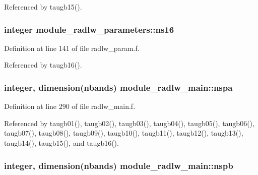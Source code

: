 Referenced by taugb15().

\subsubsection[{\texorpdfstring{ns16}{ns16}}]{\setlength{\rightskip}{0pt plus 5cm}integer module\+\_\+radlw\+\_\+parameters\+::ns16}\hypertarget{group__module__radlw__main_ga3a7ba0b8f35271e7979deea86f834479}{}\label{group__module__radlw__main_ga3a7ba0b8f35271e7979deea86f834479}


Definition at line 141 of file radlw\+\_\+param.\+f.



Referenced by taugb16().

\subsubsection[{\texorpdfstring{nspa}{nspa}}]{\setlength{\rightskip}{0pt plus 5cm}integer, dimension(nbands) module\+\_\+radlw\+\_\+main\+::nspa\hspace{0.3cm}{\ttfamily [private]}}\hypertarget{group__module__radlw__main_ga42bbf62b5d91586f17d352af74e3c032}{}\label{group__module__radlw__main_ga42bbf62b5d91586f17d352af74e3c032}


Definition at line 290 of file radlw\+\_\+main.\+f.



Referenced by taugb01(), taugb02(), taugb03(), taugb04(), taugb05(), taugb06(), taugb07(), taugb08(), taugb09(), taugb10(), taugb11(), taugb12(), taugb13(), taugb14(), taugb15(), and taugb16().

\subsubsection[{\texorpdfstring{nspb}{nspb}}]{\setlength{\rightskip}{0pt plus 5cm}integer, dimension(nbands) module\+\_\+radlw\+\_\+main\+::nspb\hspace{0.3cm}{\ttfamily [private]}}\hypertarget{group__module__radlw__main_ga520be8a7f308d9e2c8e88b185170404e}{}\label{group__module__radlw__main_ga520be8a7f308d9e2c8e88b185170404e}


